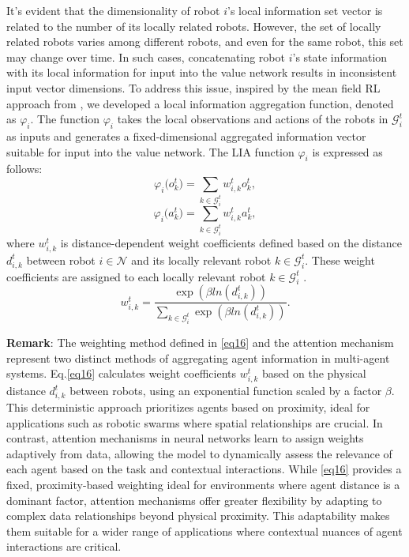 \documentclass[lettersize,journal]{IEEEtran}
\begin{document}
It's evident that the dimensionality of robot $i$'s local information set vector is related to the number of its locally related robots. However, the set of locally related robots varies among different robots, and even for the same robot, this set may change over time. In such cases, concatenating robot $i$'s state information with its local information for input into the value network results in inconsistent input vector dimensions. To address this issue, inspired by the mean field RL approach from \cite{yang2018mean}, we developed a local information aggregation function, denoted as $\varphi_{i}$. The function $\varphi_{i}$ takes the local observations and actions of the robots in $\mathcal{G}_{i}^t$ as inputs and generates a fixed-dimensional aggregated information vector suitable for input into the value network. The LIA function $\varphi_{i}$ is expressed as follows:
\begin{equation}                        \varphi_i\Big(o_k^t\Big)=\sum_{k\in\mathcal{G}_i^t}w_{i,k}^to_k^t,\label{eq14}
\end{equation}
\begin{equation}                    
    \varphi_i\big(a_k^t\big)=\sum_{k\in\mathcal{G}_i^t}w_{i,k}^ta_k^t,\label{eq15}
\end{equation}
where $w_{i,k}^t$ is distance-dependent weight coefficients defined based on the distance $d_{i,k}^t$ between robot  $i\in\mathcal{N}$  and its locally relevant robot $k\in\mathcal{G}_{i}^t$. These weight coefficients are assigned to each locally relevant robot $k\in\mathcal{G}_{i}^t$ .
\begin{equation}                    
    w_{i,k}^t=\frac{\exp\left(\beta ln(d_{i,k}^t)\right)}{\sum_{k\in\mathcal{G}_i^t}\exp\left(\beta ln(d_{i,k}^t)\right)}.\label{eq16}
\end{equation}

\textbf{Remark}: The weighting method defined in \eqref{eq16} and the attention mechanism \cite{vaswani2017attention} represent two distinct methods of aggregating agent information in multi-agent systems. Eq.\eqref{eq16} calculates weight coefficients $w_{i,k}^t$ based on the physical distance $d_{i,k}^t$ between robots, using an exponential function scaled by a factor $\beta$. This deterministic approach prioritizes agents based on proximity, ideal for applications such as robotic swarms where spatial relationships are crucial. In contrast, attention mechanisms in neural networks learn to assign weights adaptively from data, allowing the model to dynamically assess the relevance of each agent based on the task and contextual interactions. While \eqref{eq16} provides a fixed, proximity-based weighting ideal for environments where agent distance is a dominant factor, attention mechanisms offer greater flexibility by adapting to complex data relationships beyond physical proximity. This adaptability makes them suitable for a wider range of applications where contextual nuances of agent interactions are critical.
\end{document}
